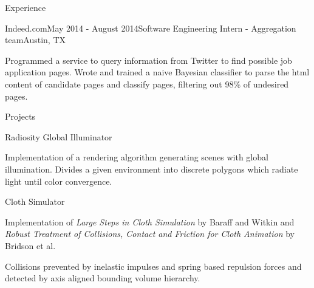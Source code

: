 \documentclass{resume} %
\begin{document}
\begin{rSection}{Experience}

\begin{rSubsection}{Indeed.com}{May 2014 - August 2014}{Software Engineering Intern - Aggregation team}{Austin, TX}
\item Programmed a service to query information from Twitter to find possible
    job application pages. Wrote and trained a naive Bayesian classifier to
    parse the html content of candidate pages and classify pages, filtering out
    98\% of undesired pages. 
\end{rSubsection}

\end{rSection}

\begin{rSection}{Projects}

  \begin{rSubsection}{Radiosity Global Illuminator}{}{}{}
  \item Implementation of a rendering algorithm generating scenes with global
      illumination. Divides a given environment into discrete polygons which
      radiate light until color convergence. 
  \end{rSubsection}

  \begin{rSubsection}{Cloth Simulator}{}{}{}
  \item Implementation of \textit{Large Steps in Cloth Simulation} by Baraff and
      Witkin and \textit{Robust Treatment of Collisions, Contact and Friction
      for Cloth Animation} by Bridson et al. 
  \item Collisions prevented by inelastic impulses and spring based repulsion
      forces and detected by axis aligned bounding volume hierarchy.
  \end{rSubsection}

\end{rSection}

\end{document}
